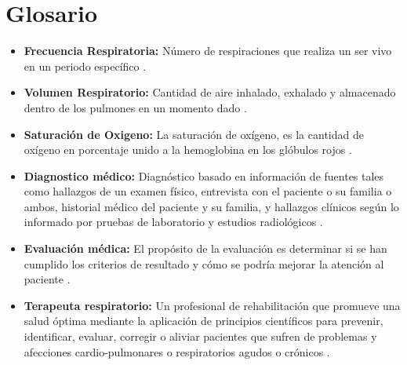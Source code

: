 \documentclass[12pt]{article}
\begin{document}


\section*{Glosario}
\begin{itemize}
\item \textbf{Frecuencia Respiratoria:} Número de respiraciones que realiza un ser vivo en un periodo específico \cite{1}. 
\item \textbf{Volumen Respiratorio:} Cantidad de aire inhalado, exhalado y almacenado dentro de los pulmones en un momento dado \cite{2}.
\item \textbf{Saturación de Oxigeno:} La saturación de oxígeno, es la cantidad de oxígeno en porcentaje unido a la hemoglobina en los glóbulos rojos \cite{3}.
\item \textbf{Diagnostico médico:} Diagnóstico basado en información de fuentes tales como hallazgos de un examen físico, entrevista con el paciente o su familia o ambos, historial médico del paciente y su familia, y hallazgos clínicos según lo informado por pruebas de laboratorio y estudios radiológicos \cite{4}.
\item \textbf{Evaluación médica:} El propósito de la evaluación es determinar si se han cumplido los criterios de resultado y cómo se podría mejorar la atención al paciente \cite{4}.
\item \textbf{Terapeuta respiratorio:} Un profesional de rehabilitación que promueve una salud óptima mediante la aplicación de principios científicos para prevenir, identificar, evaluar, corregir o aliviar pacientes que sufren de problemas y afecciones cardio-pulmonares o respiratorios agudos o crónicos \cite{4}.


\end{itemize}
\newpage

\tableofcontents
{}

\end{document}
